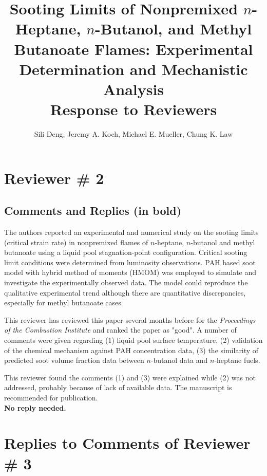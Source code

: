 \documentclass[10pt,letterpaper]{article}
\begin{document}
\title{Sooting Limits of Nonpremixed $n$-Heptane, $n$-Butanol, and Methyl Butanoate Flames: Experimental Determination and Mechanistic Analysis \\ \vspace{5mm} \Large Response to Reviewers}
\author{Sili Deng, Jeremy A. Koch, Michael E. Mueller, Chung K. Law}

\date{}

\maketitle

\section{Reviewer \# 2}
\subsection*{Comments and Replies (in bold)}

The authors reported an experimental and numerical study on the sooting limits (critical strain rate) in nonpremixed flames of $n$-heptane, $n$-butanol and methyl butanoate using a liquid pool stagnation-point configuration. Critical sooting limit conditions were determined from luminosity observations. PAH based soot model with hybrid method of moments (HMOM) was employed to simulate and investigate the experimentally observed data. The model could reproduce the qualitative experimental trend although there are quantitative discrepancies, especially for methyl butanoate cases.

This reviewer has reviewed this paper several months before for the \emph{Proceedings of the Combustion Institute} and ranked the paper as "good". A number of comments were given regarding (1) liquid pool surface temperature, (2) validation of the chemical mechanism against PAH concentration data, (3) the similarity of predicted soot volume fraction data between $n$-butanol data and $n$-heptane fuels.

This reviewer found the comments (1) and (3) were explained while (2) was not addressed, probably because of lack of available data. The manuscript is recommended for publication.
\\

\textbf{No reply needed.}

\newpage
\section*{Replies to Comments of Reviewer \# 3}
\end{document}
